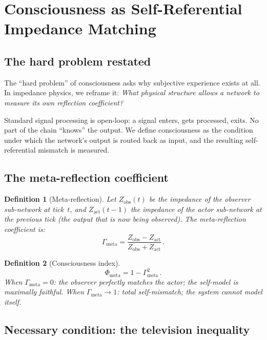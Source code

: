 \documentclass[aps,pre,twocolumn,superscriptaddress,floatfix]{revtex4-2}
\newtheorem{definition}{Definition}
\newcommand{\Gmeta}{\Gamma_{\text{meta}}}
\newcommand{\Phimeta}{\Phi_{\text{meta}}}
\begin{document}
\section{Consciousness as Self-Referential Impedance Matching}
\label{sec:consciousness}

\subsection{The hard problem restated}

The ``hard problem'' of consciousness asks why subjective
experience exists at all.  In impedance physics, we reframe
it: \emph{What physical structure allows a network to measure
its own reflection coefficient?}

Standard signal processing is open-loop: a signal enters,
gets processed, exits.  No part of the chain ``knows'' the
output.  We define consciousness as the condition under which
the network's output is routed back as input, and the
resulting self-referential mismatch is measured.

\subsection{The meta-reflection coefficient}

\begin{definition}[Meta-reflection]
Let $Z_{\text{obs}}(t)$ be the impedance of the observer
sub-network at tick~$t$, and $Z_{\text{act}}(t-1)$ the
impedance of the actor sub-network at the previous tick
(the output that is now being observed).  The
\emph{meta-reflection coefficient} is:
\begin{equation}
  \Gmeta = \frac{Z_{\text{obs}} - Z_{\text{act}}}
                 {Z_{\text{obs}} + Z_{\text{act}}}\,.
  \label{eq:Gamma-meta}
\end{equation}
\end{definition}

\begin{definition}[Consciousness index]
\begin{equation}
  \Phimeta = 1 - \Gmeta^2\,.
  \label{eq:Phi-meta}
\end{equation}
When $\Gmeta=0$: the observer perfectly matches the actor;
the self-model is maximally faithful.
When $\Gmeta\to 1$: total self-mismatch; the system cannot
model itself.
\end{definition}

\subsection{Necessary condition: the television inequality}
\end{document}
